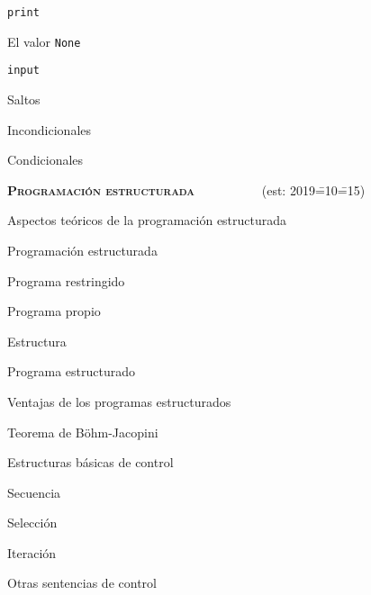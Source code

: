 \begin{longenum}
\begin{longenum}
\begin{longenum}
            \begin{longenum}
                \item \texttt{print}
                \begin{longenum}
                    \item El valor \texttt{None}
                \end{longenum}
                \item \texttt{input}
            \end{longenum}
        \end{longenum}
        \item Saltos
        \begin{longenum}
            \item Incondicionales
            \item Condicionales
        \end{longenum}
    \end{longenum}
    \item \textbf{\textsc{Programación estructurada}} \ \ \ \ \ \ \ \ \ \ (est: 2019\==10\==15)
    \begin{longenum}
        \item Aspectos teóricos de la programación estructurada
        \begin{longenum}
            \item Programación estructurada
            \item Programa restringido
            \item Programa propio
            \item Estructura
            \item Programa estructurado
            \begin{longenum}
                \item Ventajas de los programas estructurados
            \end{longenum}
            \item Teorema de Böhm-Jacopini
        \end{longenum}
        \item Estructuras básicas de control
        \begin{longenum}
            \item Secuencia
            \item Selección
            \item Iteración
            \item Otras sentencias de control

\end{longenum}
\end{longenum}
\end{longenum}
